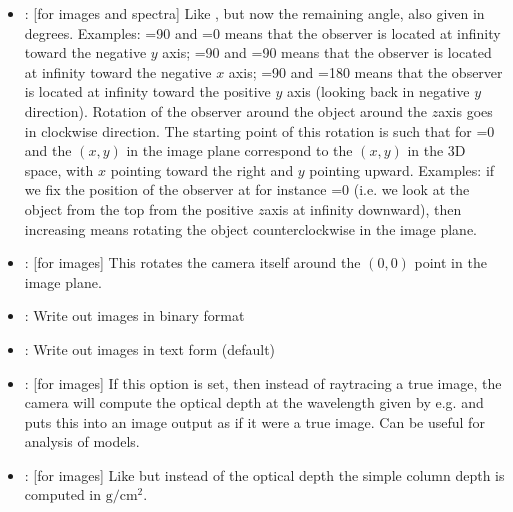 \documentclass[letterpaper,10pt,english]{sphinxmanual}
\begin{document}
\begin{itemize}
\item {} 
: {[}for images and spectra{]} Like , but now the remaining
angle, also given in degrees. Examples: =90 and =0 means
that the observer is located at infinity toward the negative \(y\) axis;
=90 and =90 means that the observer is located at infinity
toward the negative \(x\) axis; =90 and =180 means that
the observer is located at infinity toward the positive \(y\) axis
(looking back in negative \(y\) direction). Rotation of the observer
around the object around the \(z\)\sphinxhyphen{}axis goes in clockwise direction. The
starting point of this rotation is such that for =0 and 
the \((x,y)\) in the image plane correspond to the \((x,y)\) in the
3\sphinxhyphen{}D space, with \(x\) pointing toward the right and \(y\) pointing
upward. Examples: if we fix the position of the observer at for instance
=0 (i.e. we look at the object from the top from the positive
\(z\)\sphinxhyphen{}axis at infinity downward), then increasing  means rotating
the object counter\sphinxhyphen{}clockwise in the image plane.

\item {} 
: {[}for images{]} This rotates the camera itself around
the \((0,0)\) point in the image plane.

\item {} 
: Write out images in binary format

\item {} 
: Write out images in text form (default)

\item {} 
: {[}for images{]} If this option is set, then instead
of ray\sphinxhyphen{}tracing a true image, the camera will compute the optical depth
at the wavelength given by e.g.  and puts this into an image
output as if it were a true image. Can be useful for analysis of models.

\item {} 
: {[}for images{]} Like  but instead of the optical
depth the simple column depth is computed in
\(\mathrm{g}/\mathrm{cm}^2\). 


\end{itemize}
\end{document}
